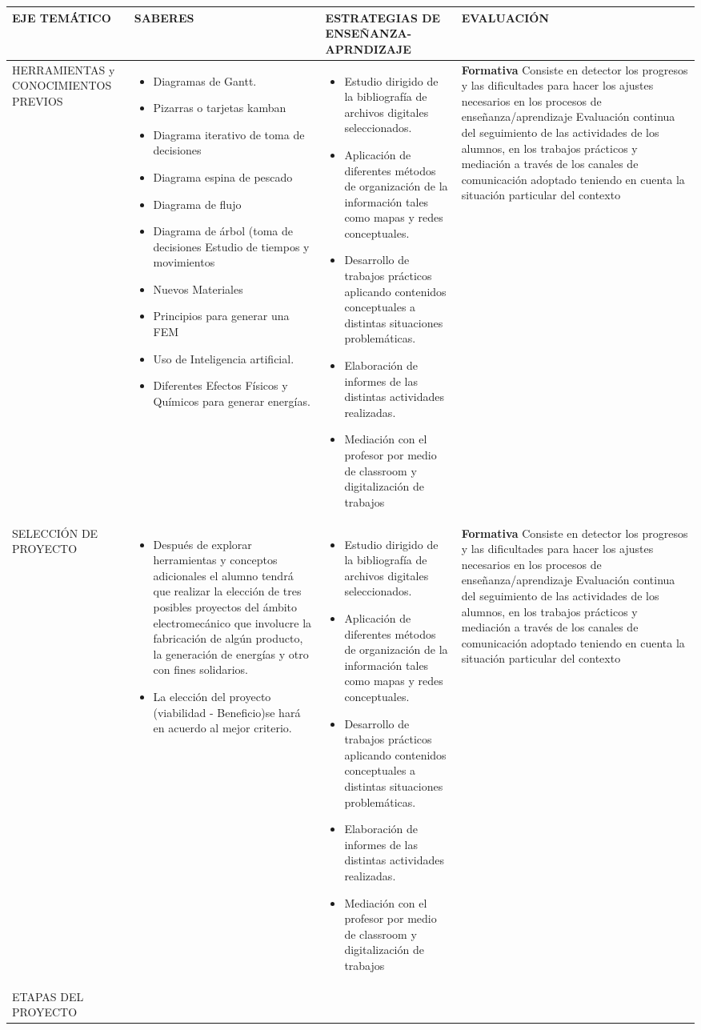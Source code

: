\documentclass[a4paper]{article}
\newcommand{\estrategias}{\setstretch{2} \centering \begin{itemize}[leftmargin=0.3cm]\item Estudio dirigido de la bibliografía de archivos digitales seleccionados.\item Aplicación de diferentes métodos de organización de la información tales como mapas y redes conceptuales. \item Desarrollo de trabajos prácticos aplicando contenidos conceptuales a distintas situaciones problemáticas.\item Elaboración de informes de las distintas actividades realizadas.\item Mediación con el profesor por medio de classroom  y digitalización de trabajos\end{itemize}
}
\newcommand{\evaluacion}{\textbf{Formativa} \setstretch{2} Consiste en detector los progresos y las dificultades para hacer los ajustes necesarios en los procesos de enseñanza/aprendizaje   Evaluación continua del seguimiento de las actividades de los alumnos, en los trabajos prácticos y mediación a través de los canales de comunicación adoptado teniendo en cuenta la situación particular del contexto}
\begin{document}
    \begin{longtable}{|p{6.5cm}|p{6.5cm}|p{6.5cm}|p{6.5cm}|}  \hline
         {\centering EJE TEMÁTICO} &  {\centering SABERES} &  {\centering ESTRATEGIAS DE ENSEÑANZA-APRNDIZAJE} & {\centering EVALUACIÓN} \\ \hline   \endhead
         HERRAMIENTAS y CONOCIMIENTOS PREVIOS & 
         \begin{itemize}[leftmargin=0.3cm]
             \item Diagramas de Gantt.
            \item Pizarras o tarjetas kamban
            \item Diagrama iterativo de toma de decisiones
            \item Diagrama espina de pescado
            \item Diagrama de flujo
            \item Diagrama de árbol (toma de decisiones Estudio de tiempos y movimientos
            \item Nuevos Materiales
            \item Principios para generar una FEM
            \item Uso de Inteligencia artificial.
            \item Diferentes Efectos Físicos y Químicos para generar energías.
                     \end{itemize} & \estrategias & \evaluacion \\ \hline
         SELECCIÓN DE PROYECTO & 
         \begin{itemize}[leftmargin=0.3cm]
             \item Después de explorar herramientas y conceptos adicionales el alumno tendrá que realizar la elección de tres posibles proyectos del ámbito electromecánico que involucre la fabricación de algún producto, la generación de energías y otro con fines solidarios.
\item La elección del proyecto (viabilidad - Beneficio)se hará en acuerdo al mejor criterio.
         \end{itemize}
        & \estrategias & \evaluacion \\ \hline
        ETAPAS DEL PROYECTO &
         \begin{itemize}[leftmargin=0.3cm]
             

\end{itemize}
\end{longtable}
\end{document}

